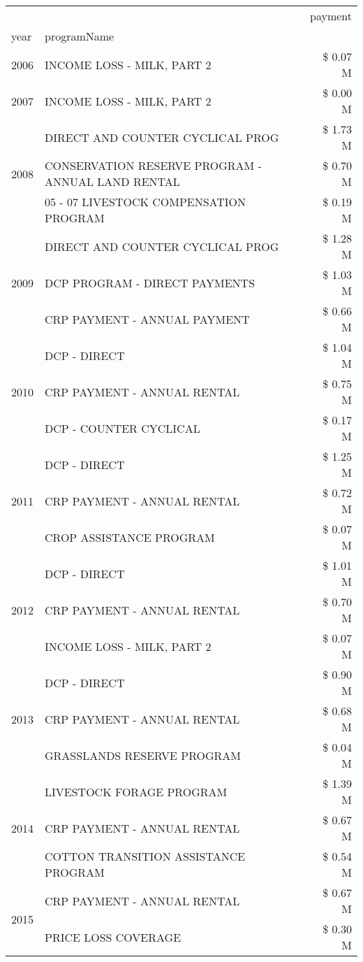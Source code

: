 \begin{tabular}{llr}
\toprule
 &  & payment \\
year & programName &  \\
\midrule
2006 & INCOME LOSS - MILK, PART 2 & \$ 0.07 M \\
\cline{1-3}
2007 & INCOME LOSS - MILK, PART 2 & \$ 0.00 M \\
\cline{1-3}
\multirow[t]{3}{*}{2008} & DIRECT AND COUNTER CYCLICAL PROG & \$ 1.73 M \\
 & CONSERVATION RESERVE PROGRAM - ANNUAL LAND RENTAL & \$ 0.70 M \\
 & 05 - 07 LIVESTOCK COMPENSATION PROGRAM & \$ 0.19 M \\
\cline{1-3}
\multirow[t]{3}{*}{2009} & DIRECT AND COUNTER CYCLICAL PROG & \$ 1.28 M \\
 & DCP PROGRAM - DIRECT PAYMENTS & \$ 1.03 M \\
 & CRP PAYMENT - ANNUAL PAYMENT & \$ 0.66 M \\
\cline{1-3}
\multirow[t]{3}{*}{2010} & DCP - DIRECT & \$ 1.04 M \\
 & CRP PAYMENT - ANNUAL RENTAL & \$ 0.75 M \\
 & DCP - COUNTER CYCLICAL & \$ 0.17 M \\
\cline{1-3}
\multirow[t]{3}{*}{2011} & DCP - DIRECT & \$ 1.25 M \\
 & CRP PAYMENT - ANNUAL RENTAL & \$ 0.72 M \\
 & CROP ASSISTANCE PROGRAM & \$ 0.07 M \\
\cline{1-3}
\multirow[t]{3}{*}{2012} & DCP - DIRECT & \$ 1.01 M \\
 & CRP PAYMENT - ANNUAL RENTAL & \$ 0.70 M \\
 & INCOME LOSS - MILK, PART 2 & \$ 0.07 M \\
\cline{1-3}
\multirow[t]{3}{*}{2013} & DCP - DIRECT & \$ 0.90 M \\
 & CRP PAYMENT - ANNUAL RENTAL & \$ 0.68 M \\
 & GRASSLANDS RESERVE PROGRAM & \$ 0.04 M \\
\cline{1-3}
\multirow[t]{3}{*}{2014} & LIVESTOCK FORAGE PROGRAM & \$ 1.39 M \\
 & CRP PAYMENT - ANNUAL RENTAL & \$ 0.67 M \\
 & COTTON TRANSITION ASSISTANCE PROGRAM & \$ 0.54 M \\
\cline{1-3}
\multirow[t]{3}{*}{2015} & CRP PAYMENT - ANNUAL RENTAL & \$ 0.67 M \\
 & PRICE LOSS COVERAGE & \$ 0.30 M \\

\end{tabular}
